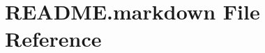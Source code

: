 \hypertarget{_r_e_a_d_m_e_8markdown}{}\section{R\+E\+A\+D\+M\+E.\+markdown File Reference}
\label{_r_e_a_d_m_e_8markdown}
